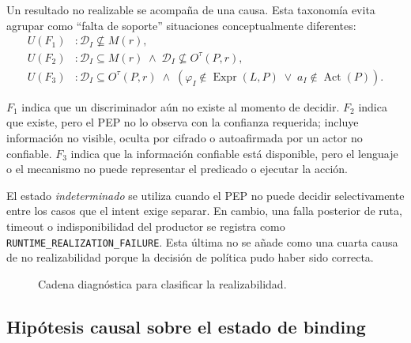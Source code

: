 Un resultado no realizable se acompaña de una causa. Esta taxonomía evita agrupar como ``falta de soporte'' situaciones conceptualmente diferentes:
\begin{align}
    U(F_1) &: \mathcal{D}_{I} \nsubseteq M(r),
    \label{eq:f1} \\
    U(F_2) &: \mathcal{D}_{I} \subseteq M(r)
              \;\land\;
              \mathcal{D}_{I} \nsubseteq O^{\tau}(P,r),
    \label{eq:f2} \\
    U(F_3) &: \mathcal{D}_{I} \subseteq O^{\tau}(P,r)
              \;\land\;
              \left(\varphi_{I} \notin \operatorname{Expr}(L,P)
              \;\lor\;
              a_{I} \notin \operatorname{Act}(P)\right).
    \label{eq:f3}
\end{align}

$F_1$ indica que un discriminador aún no existe al momento de decidir. $F_2$ indica que existe, pero el PEP no lo observa con la confianza requerida; incluye información no visible, oculta por cifrado o autoafirmada por un actor no confiable. $F_3$ indica que la información confiable está disponible, pero el lenguaje o el mecanismo no puede representar el predicado o ejecutar la acción.

El estado \textit{indeterminado} se utiliza cuando el PEP no puede decidir selectivamente entre los casos que el intent exige separar. En cambio, una falla posterior de ruta, timeout o indisponibilidad del productor se registra como \texttt{RUNTIME\_REALIZATION\_FAILURE}. Esta última no se añade como una cuarta causa de no realizabilidad porque la decisión de política pudo haber sido correcta.

\begin{figure}[H]
    \centering
    
    \caption{Cadena diagnóstica para clasificar la realizabilidad.}
    \label{fig:cadena-enforceability}
\end{figure}

\subsection{Hipótesis causal sobre el estado de binding}
\label{subsec:hipotesis-binding}

